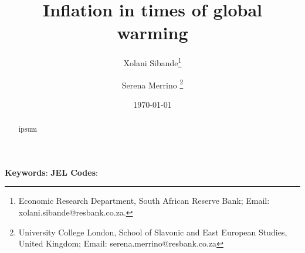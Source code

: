 \title{Inflation in times of global warming}


\author {Xolani Sibande\footnote{Economic Research Department, South African Reserve Bank; Email: xolani.sibande@resbank.co.za.} \and
Serena Merrino \footnote{University College London, School of Slavonic and East European Studies, United Kingdom; Email: serena.merrino@resbank.co.za}}


\date{\today}
\maketitle

\begin{abstract}
ipsum

\end{abstract}

\noindent\textbf{Keywords}:
\textbf{JEL Codes}:
\newpage
